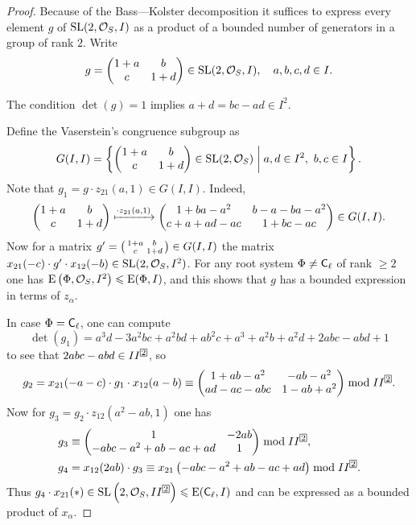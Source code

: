 \begin{proof}
Because of the Bass---Kolster decomposition it suffices to express every element $g$ of $\operatorname{SL}(2,\mathcal{O}_S,I)$ as a product of a bounded number of generators in a group of rank $2$. Write
\[ g=\begin{pmatrix}1+a & b \\ c & 1+d\end{pmatrix}\in\operatorname{SL}(2,\mathcal{O}_S,I),\quad a,b,c,d\in I. \]

The condition $\det(g)=1$ implies $a+d=bc-ad\in I^2$.

Define the Vaserstein's congruence subgroup as
\[ G(I,I)=\left\{ \begin{pmatrix}1+a & b \\ c & 1+d\end{pmatrix}\in\SL(2,\mathcal{O}_S)\;\middle|\; a,d\in I^2,\ b,c\in I \right\}. \]
Note that $g_1=g\cdot z_{21}(a,1)\in G(I,I)$. Indeed,
\[
\begin{pmatrix}
1+a & b \\ c & 1+d
\end{pmatrix} \xmapsto{\cdot z_{21}(a,1)}
\begin{pmatrix}
1+ba-a^2 & b-a-ba-a^2 \\ c+a+ad-ac & 1+bc-ac
\end{pmatrix} \in G(I,I).
\]
Now for a matrix $g'=\begin{psmallmatrix}1+a & b \\ c & 1+d\end{psmallmatrix}\in G(I,I)$ the matrix $x_{21}(-c)\cdot g'\cdot x_{12}(-b)\in\operatorname{SL}(2,\mathcal{O}_S,I^2)$. For any root system $\Phi\neq\mathsf{C}_\ell$ of rank $\geqslant2$ one has $\operatorname{E}\left(\Phi,\mathcal{O}_S,I^2\right)\leqslant\operatorname{E}(\Phi,I)$, and this shows that $g$ has a bounded expression in terms of $z_\alpha$.

In case $\Phi=\mathsf{C}_\ell$, one can compute
\[ \det(g_1)=a^3d-3a^2bc+a^2bd+ab^2c+a^3+a^2b+a^2d+2abc-abd+1 \]
to see that $2abc-abd\in II^{\indexbox{2}}$, so
\[ g_2=x_{21}(-a-c)\cdot g_1\cdot x_{12}(a-b)\equiv
\begin{pmatrix}
1+ab-a^2 & -ab-a^2 \\ ad-ac-abc & 1-ab+a^2
\end{pmatrix}\bmod II^{\indexbox{2}}. \]
Now for $g_3=g_2\cdot z_{12}\left(a^2-ab,1\right)$ one has
\begin{align*}
& g_3\equiv\begin{pmatrix} 1 & -2ab \\ -abc-a^2+ab-ac+ad & 1 \end{pmatrix}\bmod II^{\indexbox{2}},\\
& g_4=x_{12}(2ab)\cdot g_3\equiv x_{21}\left(-abc-a^2+ab-ac+ad\right)\bmod II^{\indexbox{2}}.
\end{align*}
Thus $g_4\cdot x_{21}(*)\in\SL\left(2,\mathcal{O}_S,II^{\indexbox{2}}\right)\leqslant\E(\rC_\ell,I)$ and can be expressed as a bounded product of $x_\alpha$.
\end{proof}